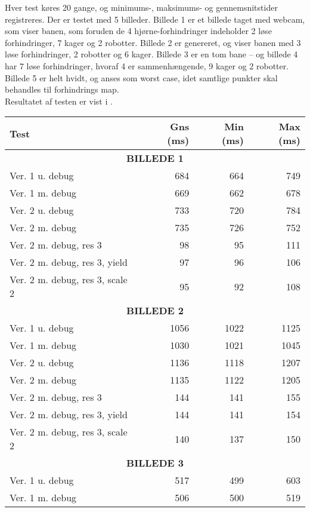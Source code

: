 Hver test køres 20 gange, og minimums-, maksimums- og gennemsnitstider registreres. Der er testet med 5 billeder. Billede 1 er et billede taget med webcam, som viser banen, som foruden de 4 hjørne-forhindringer indeholder 2 løse forhindringer, 7 kager og 2 robotter. Billede 2 er genereret, og viser banen med 3 løse forhindringer, 2 robotter og 6 kager. Billede 3 er en tom bane -- og billede 4 har 7 løse forhindringer, hvoraf 4 er sammenhængende, 9 kager og 2 robotter. Billede 5 er helt hvidt, og anses som worst case, idet samtlige punkter skal behandles til forhindrings map.\\
Resultatet af testen er vist i .
\begin{table}[!hp]
	\begin{center}
	\begin{tabular}{l | r r r}
		\textbf{Test} & \textbf{Gns (ms)} & \textbf{Min (ms)} & \textbf{Max (ms)} \\
		\hline
		\multicolumn{4}{c}{\textbf{BILLEDE 1}}\\
		\hline
		Ver. 1 u. debug & 684 & 664 & 749 \\
		Ver. 1 m. debug & 669 & 662 & 678 \\
		Ver. 2 u. debug & 733 & 720 & 784 \\
		Ver. 2 m. debug & 735 & 726 & 752 \\
		Ver. 2 m. debug, res 3 & 98 & 95 & 111 \\
		Ver. 2 m. debug, res 3, yield & 97 & 96 & 106 \\
		Ver. 2 m. debug, res 3, scale 2 & 95 & 92 & 108 \\
		\hline
		\multicolumn{4}{c}{\textbf{BILLEDE 2}}\\
		\hline
		Ver. 1 u. debug & 1056 & 1022 & 1125 \\
		Ver. 1 m. debug & 1030 & 1021 & 1045 \\
		Ver. 2 u. debug & 1136 & 1118 & 1207 \\
		Ver. 2 m. debug & 1135 & 1122 & 1205 \\
		Ver. 2 m. debug, res 3 & 144 & 141 & 155 \\
		Ver. 2 m. debug, res 3, yield & 144 & 141 & 154 \\
		Ver. 2 m. debug, res 3, scale 2 & 140 & 137 & 150 \\ 
		\hline
		\multicolumn{4}{c}{\textbf{BILLEDE 3}}\\
		\hline
		Ver. 1 u. debug & 517 & 499 & 603 \\
		Ver. 1 m. debug & 506 & 500 & 519 \\

\end{tabular}
\end{center}
\end{table}
